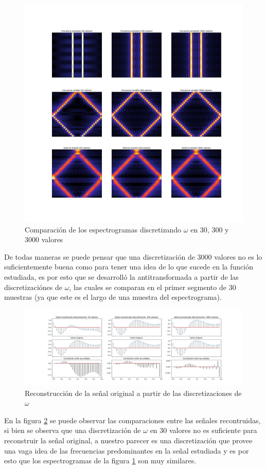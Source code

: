 \documentclass{article}
\begin{document}
	         \begin{figure}[h!]
	            \centering
	            \includegraphics[width=\textwidth]{./Imagenes/Espectrogramas/merge.jpg}
	            \caption{Comparación de los espectrogramas  discretizando $\omega$ en 30, 300 y 3000 valores}
	            \label{comparacion}
	        \end{figure}
	    
De todas maneras se puede pensar que una discretización de 3000 valores no es lo suficientemente buena como para tener una idea de lo que sucede en la función estudiada, es por esto que se desarrolló la antitransformada
a partir de las discretizaciónes de $\omega$, las cuales se comparan en el primer segmento de 30 muestras (ya que este es el largo de una muestra del espectrograma).
	         \begin{figure}[h!]
	            \centering
	            \includegraphics[width=\textwidth]{./Imagenes/antitransformada/comparacion.jpg}
	            \caption{Reconstrucción de la señal original a partir de las discretizaciones de $\omega$}
	            \label{recreacion}
	        \end{figure}
En la figura \ref{recreacion} se puede observar las comparaciones entre las señales recontruidas, si bien se observa que una discretización de $\omega$ en 30 valores no es suficiente para reconstruir la señal original,
a nuestro parecer es una discretización que provee una vaga idea de las frecuencias predominantes en la señal estudiada y es por esto que los espectrogramas de la figura \ref{comparacion} son muy similares.
\end{document}
